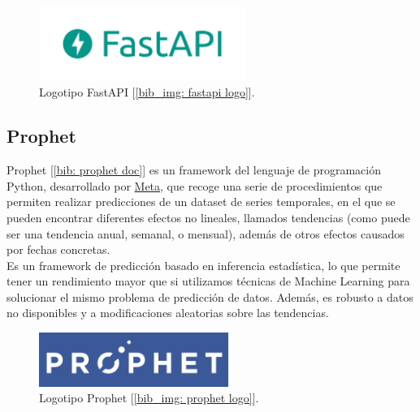 \documentclass[a4paper, oneside, 12pt]{book}
\begin{document}
	\pagebreak
	
	\begin{figure}[h!]
		\begin{center}
			\includegraphics[width=0.6\textwidth]{img/fastapi_logo.png}
			\caption{Logotipo FastAPI [\ref{bib_img: fastapi logo}].}
			\label{img: fastapi logo}
		\end{center}
	\end{figure}

	\subsection{Prophet}
	\label{sec: prophet}
	
	\noindent Prophet [\ref{bib: prophet doc}] es un framework del lenguaje de programación Python, desarrollado por \href{https://github.com/facebook/}{Meta}, que recoge una serie de procedimientos que permiten realizar predicciones de un dataset de series temporales, en el que se pueden encontrar diferentes efectos no lineales, llamados tendencias (como puede ser una tendencia anual, semanal, o mensual), además de otros efectos causados por fechas concretas. \\
	
	\noindent Es un framework de predicción basado en inferencia estadística, lo que permite tener un rendimiento mayor que si utilizamos técnicas de Machine Learning para solucionar el mismo problema de predicción de datos. Además, es robusto a datos no disponibles y a modificaciones aleatorias sobre las tendencias. 
	
	\begin{figure}[h!]
		\begin{center}
			\includegraphics[width=0.55\textwidth]{img/prophet_logo.png}
			\caption{Logotipo Prophet [\ref{bib_img: prophet logo}].}
			\label{img: prophet logo}
		\end{center}
	\end{figure}
	
\end{document}
